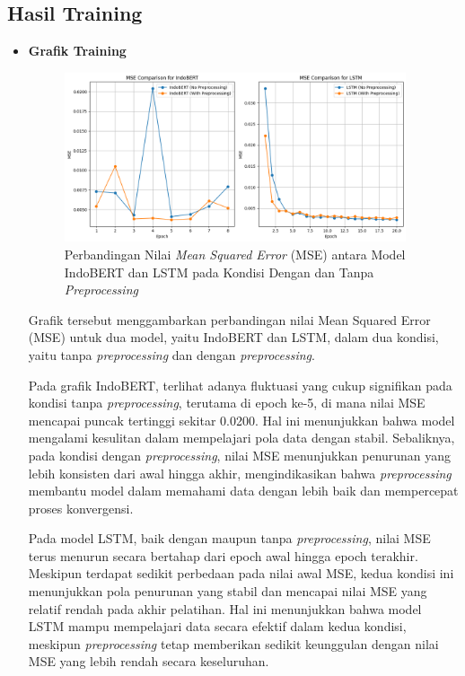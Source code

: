 \documentclass[12pt,a4paper]{article}
\begin{document}
\subsection{Hasil Training}
\begin{itemize} 
    \item \textbf{Grafik Training}
    \begin{figure}[H]
        \centering
        \includegraphics[width=0.95\textwidth]{images/mse comparison.png}
        \caption{Perbandingan Nilai \textit{Mean Squared Error} (MSE) antara Model IndoBERT dan LSTM pada Kondisi Dengan dan Tanpa \textit{Preprocessing}}
        \label{fig:grafik_training}
    \end{figure}
    
    Grafik tersebut menggambarkan perbandingan nilai Mean Squared Error (MSE) untuk dua model, yaitu IndoBERT dan LSTM, dalam dua kondisi, yaitu tanpa \textit{preprocessing} dan dengan \textit{preprocessing}.
   
    Pada grafik IndoBERT, terlihat adanya fluktuasi yang cukup signifikan pada kondisi tanpa \textit{preprocessing}, terutama di epoch ke-5, di mana nilai MSE mencapai puncak tertinggi sekitar 0.0200. Hal ini menunjukkan bahwa model mengalami kesulitan dalam mempelajari pola data dengan stabil. Sebaliknya, pada kondisi dengan \textit{preprocessing}, nilai MSE menunjukkan penurunan yang lebih konsisten dari awal hingga akhir, mengindikasikan bahwa \textit{preprocessing} membantu model dalam memahami data dengan lebih baik dan mempercepat proses konvergensi.

    Pada model LSTM, baik dengan maupun tanpa \textit{preprocessing}, nilai MSE terus menurun secara bertahap dari epoch awal hingga epoch terakhir. Meskipun terdapat sedikit perbedaan pada nilai awal MSE, kedua kondisi ini menunjukkan pola penurunan yang stabil dan mencapai nilai MSE yang relatif rendah pada akhir pelatihan. Hal ini menunjukkan bahwa model LSTM mampu mempelajari data secara efektif dalam kedua kondisi, meskipun \textit{preprocessing} tetap memberikan sedikit keunggulan dengan nilai MSE yang lebih rendah secara keseluruhan.


\end{itemize}
\end{document}
